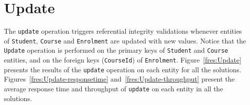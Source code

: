 
\section{Update} \label{s:results-update}
The \texttt{update} operation triggers  referential integrity validations
whenever entities of \texttt{Student},  \texttt{Course} and \texttt{Enrolment}
are updated with new values. Notice that the \texttt{Update} operation is
performed  on the primary keys of \texttt{Student} and \texttt{Course} entities,
 and on the foreign keys (\texttt{CourseId}) of \texttt{Enrolment}.
Figure~\ref{fres:Update} presents the results of the \texttt{update} operation
on each entity for all the solutions.
Figures~\ref{fres:Update-responsetime} and~\ref{fres:Update-throughput} present
the average response time and throughput of \texttt{update} on each entity in
all the solutions.

